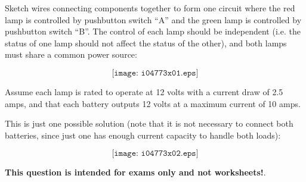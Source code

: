 

Sketch wires connecting components together to form one circuit where the red lamp is controlled by pushbutton switch ``A'' and the green lamp is controlled by pushbutton switch ``B''.  The control of each lamp should be independent (i.e. the status of one lamp should not affect the status of the other), and both lamps must share a common power source:

$$\texttt{[image: i04773x01.eps]}$$

Assume each lamp is rated to operate at 12 volts with a current draw of 2.5 amps, and that each battery outputs 12 volts at a maximum current of 10 amps.







This is just one possible solution (note that it is not necessary to connect both batteries, since just one has enough current capacity to handle both loads):

$$\texttt{[image: i04773x02.eps]}$$
 






{\bf This question is intended for exams only and not worksheets!}.



